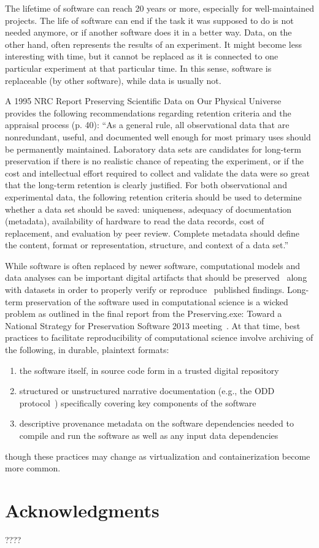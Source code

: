 \documentclass[fleqn,10pt]{wlpeerj} %
\begin{document}
The lifetime of software can reach 20 years or more, especially for well-maintained projects. The life of software can end if the task it was supposed to do is not needed anymore, or if another software does it in a better way. Data, on the other hand, often represents the results of an experiment. It might become less interesting with time, but it cannot be replaced as it is connected to one particular experiment at that particular time. In this sense, software is replaceable (by other software), while data is usually not.

A 1995 NRC Report Preserving Scientific Data on Our Physical Universe~\citep{NRC1995} provides the following recommendations regarding retention criteria and the appraisal process (p. 40): ``As a general rule, all observational data that are nonredundant, useful, and documented well enough for most primary uses should be permanently maintained. Laboratory data sets are candidates for long-term preservation if there is no realistic chance of repeating the experiment, or if the cost and intellectual effort required to collect and validate the data were so great that the long-term retention is clearly justified. For both observational and experimental data, the following retention criteria should be used to determine whether a data set should be saved: uniqueness, adequacy of documentation (metadata), availability of hardware to read the data records, cost of replacement, and evaluation by peer review. Complete metadata should define the content, format or representation, structure, and context of a data set.''

While software is often replaced by newer software, computational models and data analyses can be important digital artifacts that should be preserved~\citep{rollins2014} along with datasets in order to properly verify or reproduce~\citep{Peng2011} published findings. Long-term preservation of the software used in computational science is a wicked problem as outlined in the final report from the Preserving.exe: Toward a National Strategy for Preservation Software 2013 meeting~\citep{Preserving.exe}. At that time, best practices to facilitate reproducibility of computational science involve archiving of the following, in durable, plaintext formats:
\begin{enumerate}
\item the software itself, in source code form in a trusted digital repository
\item structured or unstructured narrative documentation (e.g., the ODD protocol~\citep{Grimm2013}) specifically covering key components of the software
\item descriptive provenance metadata on the software dependencies needed to compile and run the software as well as any input data dependencies
\end{enumerate}
though these practices may change as virtualization and containerization become more common.

\section*{Acknowledgments}

????


\end{document}
